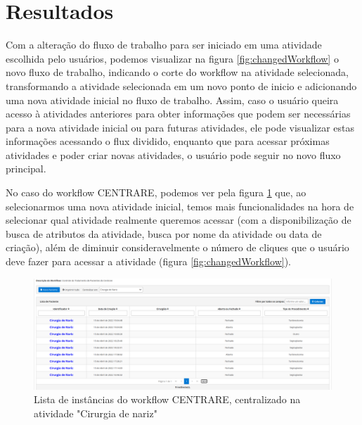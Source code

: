 \section{Resultados} \label{results}


Com a alteração do fluxo de trabalho para ser iniciado em uma atividade escolhida pelo usuários, podemos visualizar na figura \ref{fig:changedWorkflow} o novo fluxo de trabalho, indicando o corte do workflow na atividade selecionada, transformando a atividade selecionada em um novo ponto de inicio e adicionando uma nova atividade inicial no fluxo de trabalho. Assim, caso o usuário queira acesso à atividades anteriores para obter informações que podem ser necessárias para a nova atividade inicial ou para futuras atividades, ele pode visualizar estas informações acessando o flux dividido, enquanto que para acessar próximas atividades e poder criar novas atividades, o usuário pode seguir no novo fluxo principal.

No caso do workflow CENTRARE, podemos ver pela figura \ref{fig:changedInstance} que, ao selecionarmos uma nova atividade inicial, temos mais funcionalidades na hora de selecionar qual atividade realmente queremos acessar (com a disponibilização de busca de atributos da atividade, busca por nome da atividade ou data de criação), além de diminuir consideravelmente o número de cliques que o usuário deve fazer para acessar a atividade (figura \ref{fig:changedWorkflow}).

\begin{figure}
    \centering
    \includegraphics[width=1\textwidth]{imgs/CENTRARE/instanciaAlterada.png}
    \caption{Lista de instâncias do workflow CENTRARE, centralizado na atividade "Cirurgia de nariz"}
    \label{fig:changedInstance}
\end{figure}

